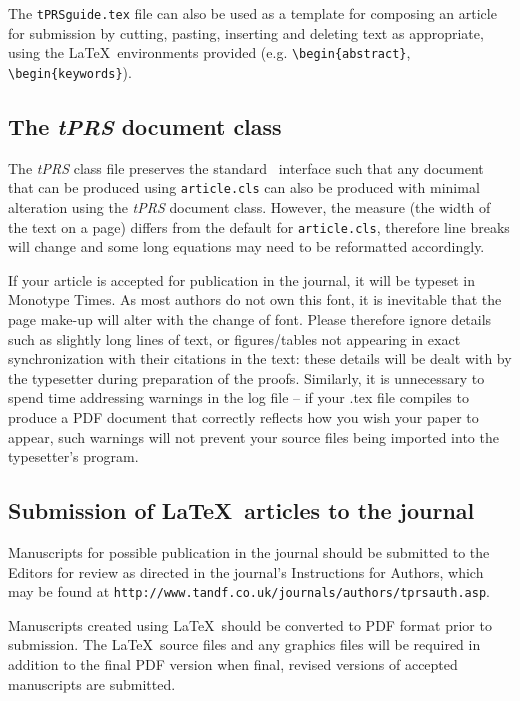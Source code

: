 \documentclass{tPRS2e}
\begin{document}
The \texttt{tPRSguide.tex} file can also be used as a template for composing an article for submission by cutting, pasting, inserting and
deleting text as appropriate, using the \LaTeX\ environments provided (e.g. \verb"\begin{abstract}", \verb"\begin{keywords}").


\subsection{The \textit{tPRS} document class}\label{class}

The \textit{tPRS} class file preserves the standard \LaTeXe\ interface such that any document that can
be produced using \texttt{article.cls} can also be produced with minimal alteration using the \textit{tPRS} document class.
However, the measure (the width of the text on a page) differs from the default for \texttt{article.cls}, therefore line breaks
will change and some long equations may need to be reformatted accordingly.

If your article is accepted for publication in the journal, it will be typeset in Monotype Times. As most authors do not own this font, it is inevitable that the page make-up will alter with the change of font. Please therefore ignore details such as slightly long lines of text, or figures/tables not appearing in exact synchronization with their citations in the text: these details will be dealt with by the typesetter during preparation of the proofs. Similarly, it is unnecessary to spend time addressing warnings in the log file -- if your .tex file compiles to produce a PDF document that correctly reflects how you wish your paper to appear, such warnings will not prevent your source files being imported into the typesetter's program.


\subsection{Submission of \LaTeX\ articles to the journal}\label{submission}

Manuscripts for possible publication in the journal should be submitted to the Editors for review as directed in the journal's Instructions for Authors, which may be found at \texttt{http://www.tandf.co.uk/journals/authors/tprsauth.asp}.

Manuscripts created using \LaTeX\ should be converted to PDF format prior to submission. The \LaTeX\ source files and any graphics files will be required in addition to the final PDF version when final, revised versions of accepted manuscripts are submitted.
\end{document}
